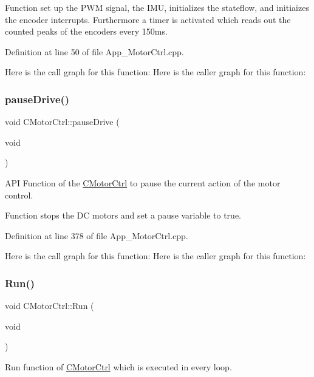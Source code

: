 Function set up the P\+WM signal, the I\+MU, initializes the stateflow, and initiaizes the encoder interrupts. Furthermore a timer is activated which reads out the counted peaks of the encoders every 150ms. 

Definition at line 50 of file App\+\_\+\+Motor\+Ctrl.\+cpp.

Here is the call graph for this function\+:
Here is the caller graph for this function\+:
\mbox{\label{class_c_motor_ctrl_af3e047be659fb9f49f1644ba2eca4684}} 
\subsubsection{\texorpdfstring{pauseDrive()}{pauseDrive()}}
{\footnotesize\ttfamily void C\+Motor\+Ctrl\+::pause\+Drive (\begin{DoxyParamCaption}\item[{void}]{ }\end{DoxyParamCaption})}



A\+PI Function of the \mbox{\hyperlink{class_c_motor_ctrl}{C\+Motor\+Ctrl}} to pause the current action of the motor control. 

Function stops the DC motors and set a pause variable to true. 

Definition at line 378 of file App\+\_\+\+Motor\+Ctrl.\+cpp.

Here is the call graph for this function\+:
Here is the caller graph for this function\+:
\mbox{\label{class_c_motor_ctrl_a63e5dd36be027fe8a5e1acee5c1322c8}} 
\subsubsection{\texorpdfstring{Run()}{Run()}}
{\footnotesize\ttfamily void C\+Motor\+Ctrl\+::\+Run (\begin{DoxyParamCaption}\item[{void}]{ }\end{DoxyParamCaption})}



Run function of \mbox{\hyperlink{class_c_motor_ctrl}{C\+Motor\+Ctrl}} which is executed in every loop. 

